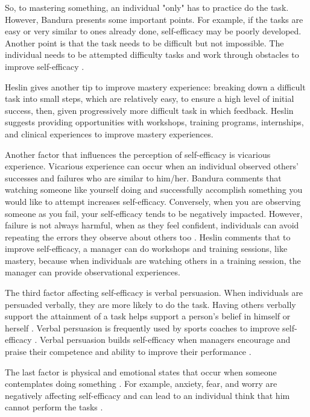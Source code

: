 \documentclass{TheMartianReport}
\begin{document}
So, to mastering something, an individual "only" has to practice do the task. However, Bandura \cite{bandura1994ramachaudran} presents some important points. For example, if the tasks are easy or very similar to ones already done, self-efficacy may be poorly developed. Another point is that the task needs to be difficult but not impossible. The individual needs to be attempted difficulty tasks and work through obstacles to improve self-efficacy \cite{bandura2010self}. 

Heslin \cite{heslin1999boosting} gives another tip to improve mastery experience: breaking down a difficult task into small steps, which are relatively easy, to ensure a high level of initial success, then, given progressively more difficult task in which feedback. Heslin suggests providing opportunities with workshops, training programs, internships, and clinical experiences to improve mastery experiences. 


 Another factor that influences the perception of self-efficacy is vicarious experience. Vicarious experience can occur when an individual observed others' successes and failures who are similar to him/her. Bandura \cite{bandura1977self} comments that watching someone like yourself doing and successfully accomplish something you would like to attempt increases self-efficacy. Conversely, when you are observing someone as you fail, your self-efficacy tends to be negatively impacted. However, failure is not always harmful, when as they feel confident, individuals can avoid repeating the errors they observe about others too \cite{brown2013self}. 
 Heslin \cite{heslin1999boosting} comments that to improve self-efficacy, a manager can do workshops and training sessions, like mastery, because when individuals are watching others in a training session, the manager can provide observational experiences.
 
 
 The third factor affecting self-efficacy is verbal persuasion. When individuals are persuaded verbally, they are more likely to do the task. Having others verbally support the attainment of a task helps support a person's belief in himself or herself \cite{bandura1977self}. Verbal persuasion is frequently used by sports coaches to improve self-efficacy \cite{brown2013self}. Verbal persuasion builds self-efficacy when managers encourage and praise their competence and ability to improve their performance \cite{heslin1999boosting}. 
 
The last factor is physical and emotional states that occur when someone contemplates doing something \cite{bandura1977self}. For example, anxiety, fear, and worry are negatively affecting self-efficacy and can lead to an individual think that him cannot perform the tasks \cite{pajares1996self}.
\end{document}
